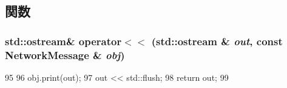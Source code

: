 \subsection{関数}
\hypertarget{NetworkMessage_8hh_a5d0e888647d1237a9e60cb70a456f466}{
\subsubsection[{operator$<$$<$}]{\setlength{\rightskip}{0pt plus 5cm}std::ostream\& operator$<$$<$ (std::ostream \& {\em out}, \/  const {\bf NetworkMessage} \& {\em obj})}}
\label{NetworkMessage_8hh_a5d0e888647d1237a9e60cb70a456f466}



\begin{DoxyCode}
95 {
96     obj.print(out);
97     out << std::flush;
98     return out;
99 }
\end{DoxyCode}
